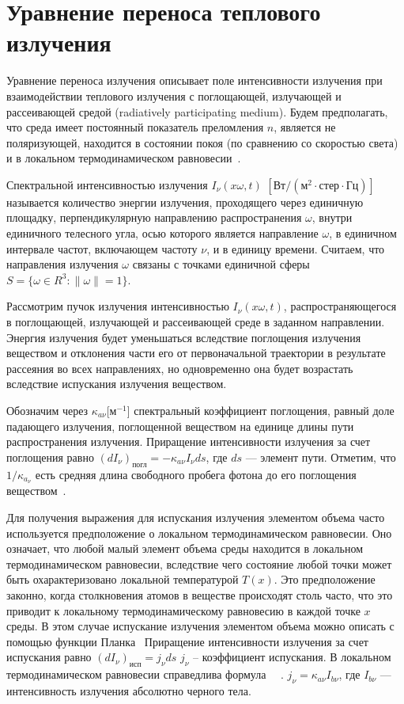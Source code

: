 \section{Уравнение переноса теплового излучения}\label{sec:ch1/sec1}
Уравнение переноса излучения описывает поле интенсивности излучения
при взаимодействии теплового излучения с поглощающей,
излучающей и рассеивающей средой
(radiatively participating medium).
Будем предполагать, что среда имеет постоянный показатель
преломления $n$, является не поляризующей,
находится в состоянии покоя (по сравнению со скоростью света) и в локальном
термодинамическом равновесии~\cite[280]{modest2013radiative}.


Спектральной интенсивностью излучения $I_\nu (x \omega, t)$
$[\text{Вт}/(\text{м}^2 \cdot \text{стер} \cdot \text{Гц})]$
называется количество энергии излучения, проходящего через единичную
площадку, перпендикулярную направлению распространения $\omega$,
внутри единичного телесного угла,
осью которого является направление $\omega$, в единичном
интервале частот, включающем частоту $\nu$, и в единицу времени.
Считаем, что направления излучения $\omega$ связаны с точками единичной
сферы $S = \{\omega \in R^3: \| \omega\| = 1\}$.


Рассмотрим пучок излучения интенсивностью $I_\nu (x \omega, t)$,
распространяющегося в поглощающей,
излучающей и рассеивающей среде в заданном направлении.
Энергия излучения будет уменьшаться вследствие поглощения
излучения веществом и отклонения части его от первоначальной траектории в
результате рассеяния во всех направлениях, но одновременно она будет возрастать
вследствие испускания излучения веществом.


Обозначим через $\kappa_{a\nu}$[$\text{м}^{-1}$] спектральный коэффициент поглощения,
равный доле падающего излучения, поглощенной веществом на единице длины
пути распространения излучения.
Приращение интенсивности излучения за счет поглощения равно
$(dI_\nu)_\text{погл} = -\kappa_{a\nu} I_\nu ds$, где $ds$ — элемент пути.
Отметим, что $1/\kappa_{a_\nu}$ есть средняя
длина свободного пробега фотона до его поглощения
веществом~\cite[281]{modest2013radiative}.


Для получения выражения для испускания излучения элементом объема
часто используется предположение о локальном термодинамическом равновесии.
Оно означает, что любой малый элемент объема среды находится в
локальном термодинамическом равновесии, вследствие чего состояние любой
точки может быть охарактеризовано локальной температурой $T(x)$.
Это предположение законно, когда столкновения атомов в веществе происходят столь
часто, что это приводит к локальному термодинамическому равновесию в каждой точке $x$ среды.
В этом случае испускание излучения элементом объема
можно описать с помощью функции Планка~\cite[36]{Ozisik1976}
Приращение интенсивности излучения за счет испускания равно
$(dI_\nu)_\text{исп}  = j_\nu ds$  $j_\nu$ -- коэффициент испускания.
В локальном термодинамическом равновесии справедлива формула~\cite[36]{Ozisik1976}
~\cite[282]{modest2013radiative}. $j_\nu = \kappa_{a\nu} I_{b\nu}$, где
$I_{b\nu}$ — интенсивность излучения абсолютно черного тела.


